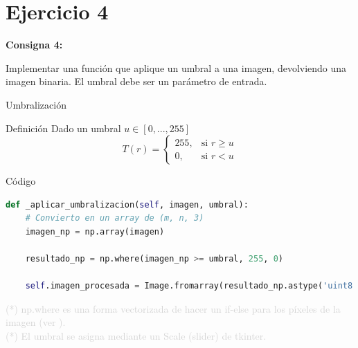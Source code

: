 \documentclass{beamer}
\begin{document}
\section{Ejercicio 4}

\begin{frame}
	\begin{center}
		\textcolor{unahurverde}{\textbf{Consigna 4:}}
	\end{center}
	\justifying
	
	Implementar una función que aplique un umbral a una imagen, devolviendo una imagen binaria. El umbral debe ser un parámetro de entrada.
\end{frame}

\begin{frame}[fragile]{Umbralización}
	\justifying
	
	\begin{block}{Definición}
		Dado un umbral $u \in [0,...,255]$
		\[
		T(r) =
		\begin{cases}
			255, & \text{si } r \geq u \\
			0, & \text{si } r < u
		\end{cases}
		\]
	\end{block}
\end{frame}

\begin{frame}[fragile]{Código}
	\justifying
	
	\begin{lstlisting}[language=Python]
def _aplicar_umbralizacion(self, imagen, umbral):
	# Convierto en un array de (m, n, 3)
	imagen_np = np.array(imagen)
	
	resultado_np = np.where(imagen_np >= umbral, 255, 0)
	
	self.imagen_procesada = Image.fromarray(resultado_np.astype('uint8'))
	\end{lstlisting}
	
	\vfill
	\footnotesize \textcolor{lightgray}{(*) np.where es una forma vectorizada de hacer un if-else para los píxeles de la imagen (ver \cite{numpy.where}).}\\
	\footnotesize \textcolor{lightgray}{(*) El umbral se asigna mediante un Scale (slider) de tkinter.}
\end{frame}
\end{document}
